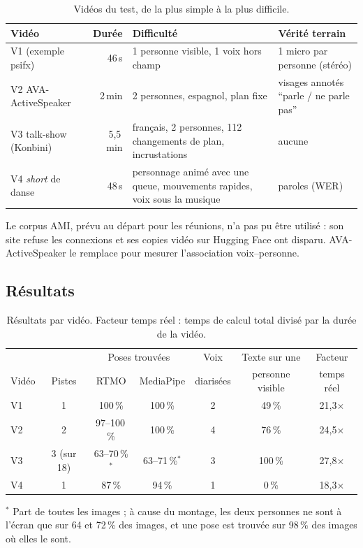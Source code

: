 \documentclass[11pt,a4paper]{report}
\newcommand{\code}[1]{\texttt{\detokenize{#1}}}
\begin{document}
\begin{table}[H]
\centering
\caption{Vidéos du test, de la plus simple à la plus difficile.}
\label{tab:e2e-videos}
\small
\begin{tabularx}{\textwidth}{@{}lrYY@{}}
\toprule
Vidéo & Durée & Difficulté & Vérité terrain \\
\midrule
V1 \code{Video.mp4} (exemple psifx) & 46\,s & 1 personne visible, 1 voix hors champ & 1 micro par personne (stéréo) \\
V2 AVA-ActiveSpeaker \cite{roth2020ava} & 2\,min & 2 personnes, espagnol, plan fixe & visages annotés \enquote{parle / ne parle pas} \\
V3 talk-show (Konbini) & 5,5\,min & français, 2 personnes, 112 changements de plan, incrustations & aucune \\
V4 \emph{short} de danse & 48\,s & personnage animé avec une queue, mouvements rapides, voix sous la musique & paroles (WER) \\
\bottomrule
\end{tabularx}
\end{table}

Le corpus AMI, prévu au départ pour les réunions, n'a pas pu être utilisé : son site refuse les connexions et ses
copies vidéo sur Hugging Face ont disparu. AVA-ActiveSpeaker le remplace pour mesurer l'association voix--personne.

\subsection{Résultats}

\begin{table}[H]
\centering
\caption{Résultats par vidéo. Facteur temps réel : temps de calcul total divisé par la durée de la vidéo.}
\label{tab:e2e-resultats}
\small
\begin{tabular}{@{}lcccccc@{}}
\toprule
& & \multicolumn{2}{c}{Poses trouvées} & Voix & Texte sur une & Facteur \\
\cmidrule(lr){3-4}
Vidéo & Pistes & RTMO & MediaPipe & diarisées & personne visible & temps réel \\
\midrule
V1 & 1 & 100\,\% & 100\,\% & 2 & 49\,\% & 21,3$\times$ \\
V2 & 2 & 97--100\,\% & 100\,\% & 4 & 76\,\% & 24,5$\times$ \\
V3 & 3 (sur 18) & 63--70\,\%$^*$ & 63--71\,\%$^*$ & 3 & 100\,\% & 27,8$\times$ \\
V4 & 1 & 87\,\% & 94\,\% & 1 & 0\,\% & 18,3$\times$ \\
\bottomrule
\end{tabular}

\smallskip
\footnotesize $^*$ Part de toutes les images ; à cause du montage, les deux personnes ne sont à l'écran que sur 64 et
72\,\% des images, et une pose est trouvée sur 98\,\% des images où elles le sont.
\end{table}
\end{document}
